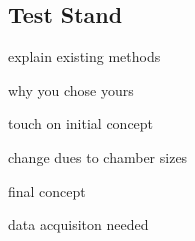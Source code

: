 \subsection{Test Stand}

explain existing methods

why you chose yours

touch on initial concept

change dues to chamber sizes

final concept

data acquisiton needed

